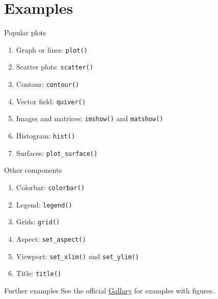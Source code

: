 \documentclass[english, nochinese]{../TeXTemplate/pkuslide}
\begin{document}
\section{Examples}

\begin{frame}
\sectionpage
\end{frame}

\begin{frame}[fragile]{Popular plots}
\begin{enumerate}
\item Graph or lines: \verb"plot()"
\item Scatter plots: \verb"scatter()"
\item Contour: \verb"contour()"
\item Vector field: \verb"quiver()"
\item Images and matrices: \verb"imshow()" and \verb"matshow()"
\item Histogram: \verb"hist()"
\item Surfaces: \verb"plot_surface()"
\end{enumerate}
\end{frame}

\begin{frame}[fragile]{Other components}
\begin{enumerate}
\item Colorbar: \verb"colorbar()"
\item Legend: \verb"legend()"
\item Grids: \verb"grid()"
\item Aspect: \verb"set_aspect()"
\item Viewport: \verb"set_xlim()" and \verb"set_ylim()"
\item Title: \verb"title()"
\end{enumerate}
\end{frame}

\begin{frame}{Further examples}
See the official \href{https://matplotlib.org/gallery.html}{Gallary} for examples with figures.
\end{frame}
\end{document}
